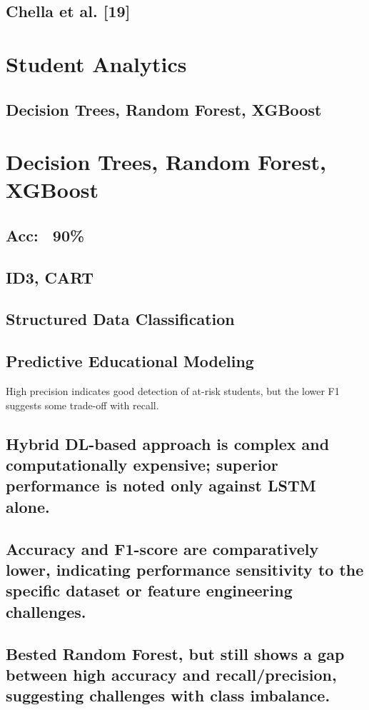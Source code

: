 \documentclass[twocolumn]{svjour3}
\begin{document}
\subsection{Chella et al. [19]}
\section{Student Analytics}
\subsection{Decision Trees, Random Forest, XGBoost}

\section{Decision Trees, Random Forest, XGBoost}
\subsection{Acc: ~90\%}
\subsection{ID3, CART}
\subsection{Structured Data Classification}
\subsection{Predictive Educational Modeling}
High precision indicates good detection of at-risk students, but the lower F1 suggests some trade-off with recall.
\subsection{Hybrid DL-based approach is complex and computationally expensive; superior performance is noted only against LSTM alone.}
\subsection{Accuracy and F1-score are comparatively lower, indicating performance sensitivity to the specific dataset or feature engineering challenges.}
\subsection{Bested Random Forest, but still shows a gap between high accuracy and recall/precision, suggesting challenges with class imbalance.}
\end{document}
